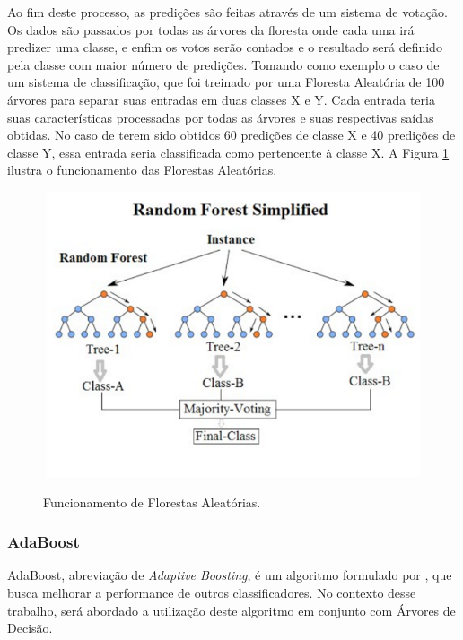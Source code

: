 Ao fim deste processo, as predições são feitas através de um sistema de votação. Os dados são passados por todas as árvores da floresta onde cada uma irá predizer uma classe, e enfim os votos serão contados e o resultado será definido pela classe com maior número de predições. 
Tomando como exemplo o caso de um sistema de classificação, que foi treinado por uma Floresta Aleatória de 100 árvores para separar suas entradas em duas classes X e Y. Cada entrada teria suas características processadas por todas as árvores e suas respectivas saídas obtidas. No caso de terem sido obtidos 60 predições de classe X e 40 predições de classe Y, essa entrada seria classificada como pertencente à classe X. A Figura \ref{f.random-forest} ilustra o funcionamento das Florestas Aleatórias.

\begin{figure}[h]
\caption{\small Funcionamento de Florestas Aleatórias.}
\centering
\includegraphics[scale=0.60]{figs/random-forests.png}
\label{f.random-forest}
\end{figure}

\subsubsection{AdaBoost}

AdaBoost, abreviação de \textit{Adaptive Boosting}, é um algoritmo formulado por \cite{FREUND1997119}, que busca melhorar a performance de outros classificadores. No contexto desse trabalho, será abordado a utilização deste algoritmo em conjunto com Árvores de Decisão.

